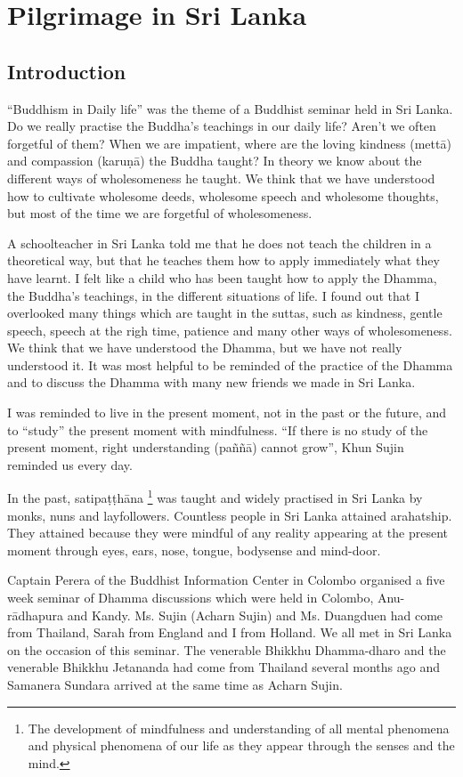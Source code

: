 

\part{Pilgrimage in Sri Lanka}


\chapter{Introduction}

``Buddhism in Daily life'' was the theme of a Buddhist seminar held in
Sri Lanka. Do we really practise the Buddha's teachings in our daily
life? Aren't we often forgetful of them? When we are impatient, where
are the loving kindness (mettā) and compassion (karuṇā) the Buddha
taught? In theory we know about the different ways of wholesomeness he
taught. We think that we have understood how to cultivate wholesome
deeds, wholesome speech and wholesome thoughts, but most of the time we
are forgetful of wholesomeness.

A schoolteacher in Sri Lanka told me that he does not teach the children
in a theoretical way, but that he teaches them how to apply immediately
what they have learnt. I felt like a child who has been taught how to
apply the Dhamma, the Buddha's teachings, in the different situations of
life. I found out that I overlooked many things which are taught in the
suttas, such as kindness, gentle speech, speech at the righ time,
patience and many other ways of wholesomeness. We think that we have
understood the Dhamma, but we have not really understood it. It was most
helpful to be reminded of the practice of the Dhamma and to discuss the
Dhamma with many new friends we made in Sri Lanka.

I was reminded to live in the present moment, not in the past or the
future, and to ``study'' the present moment with mindfulness. ``If there
is no study of the present moment, right understanding (paññā) cannot
grow'', Khun Sujin reminded us every day.

In the past, satipaṭṭhāna
\footnote{The development of mindfulness and
understanding of all mental phenomena and physical phenomena of our life
as they appear through the senses and the mind.}
was taught and widely practised in Sri Lanka by monks, nuns and
layfollowers. Countless people in Sri Lanka attained arahatship. They
attained because they were mindful of any reality appearing at the
present moment through eyes, ears, nose, tongue, bodysense and
mind-door.

Captain Perera of the Buddhist Information Center in Colombo organised a
five week seminar of Dhamma discussions which were held in Colombo,
Anu-rādhapura and Kandy. Ms. Sujin (Acharn Sujin) and Ms. Duangduen had
come from Thailand, Sarah from England and I from Holland. We all met in
Sri Lanka on the occasion of this seminar. The venerable Bhikkhu
Dhamma-dharo and the venerable Bhikkhu Jetananda had come from Thailand
several months ago and Samanera Sundara arrived at the same time as
Acharn Sujin.

